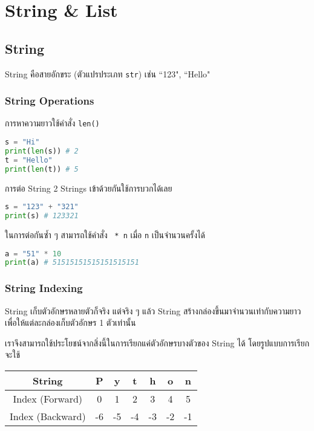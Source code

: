 \section{String \& List}

\subsection{String}

String คือสายอักขระ (ตัวแปรประเภท \verb|str|) เช่น ``123", ``Hello"

\subsubsection{String Operations}

การหาความยาวใช้คำสั่ง \verb|len()|

\begin{lstlisting}[language=Python]
s = "Hi"
print(len(s)) # 2
t = "Hello"
print(len(t)) # 5
\end{lstlisting}

การต่อ String 2 Strings เข้าด้วยกันใช้การบวกได้เลย

\begin{lstlisting}[language=Python]
s = "123" + "321"
print(s) # 123321
\end{lstlisting}

ในการต่อกันซ้ำ ๆ สามารถใช้คำสั่ง \verb | * n| เมื่อ \verb|n| เป็นจำนวนครั้งได้

\begin{lstlisting}[language=Python]
a = "51" * 10
print(a) # 51515151515151515151
\end{lstlisting}

\subsubsection{String Indexing}

String เก็บตัวอักษรหลายตัวก็จริง แต่จริง ๆ แล้ว String สร้างกล่องขึ้นมาจำนวนเท่ากับความยาวเพื่อให้แต่ละกล่องเก็บตัวอักษร 1 ตัวเท่านั้น

เราจึงสามารถใช้ประโยชน์จากสิ่งนี้ในการเรียกแค่ตัวอักษรบางตัวของ String ได้ โดยรูปแบบการเรียกจะใช้

\begin{center}
    \begin{tabular}{|c|c|c|c|c|c|c|}
         \hline
         String & P & y & t & h & o & n\\
         \hline
         Index (Forward) & 0 & 1 & 2 & 3 & 4 & 5\\
         \hline
         Index (Backward) & -6 & -5 & -4 & -3 & -2 & -1\\
         \hline
    \end{tabular}
\end{center}

